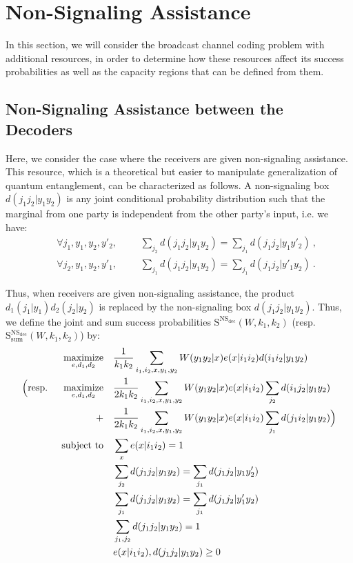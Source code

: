 \section{Non-Signaling Assistance}
\label{section:NSBC}
In this section, we will consider the broadcast channel coding problem with additional resources, in order to determine how these resources affect its success probabilities as well as the capacity regions that can be defined from them.

\subsection{Non-Signaling Assistance between the Decoders}
Here, we consider the case where the receivers are given non-signaling assistance. This resource, which is a theoretical but easier to manipulate generalization of quantum entanglement, can be characterized as follows.  A non-signaling box $d(j_1j_2|y_1y_2)$ is any joint conditional probability distribution such that the marginal from one party is independent from the other party's input, i.e. we have:
\begin{equation}
  \begin{aligned}
    &&\forall j_1,y_1,y_2,y'_2, &&&\sum_{j_2} d(j_1j_2|y_1y_2) = \sum_{j_1} d(j_1j_2|y_1y'_2) \ ,\\
    &&\forall j_2,y_1,y_2,y'_1, &&&\sum_{j_1} d(j_1j_2|y_1y_2) = \sum_{j_1} d(j_1j_2|y'_1y_2) \ .
  \end{aligned}
\end{equation}

Thus, when receivers are given non-signaling assistance, the product $d_1(j_1|y_1)d_2(j_2|y_2)$ is replaced by the non-signaling box $d(j_1j_2|y_1y_2)$. Thus, we define the joint and sum success probabilities $\mathrm{S}^{\mathrm{NS}_{\text{dec}}}(W,k_1,k_2)$ (resp. $\mathrm{S}_{\text{sum}}^{\mathrm{NS}_{\text{dec}}}(W,k_1,k_2)$) by:
\begin{equation}
  \begin{aligned}
    &&\underset{e,d_1,d_2}{\operatorname{\text{maximize}}} &&& \frac{1}{k_1k_2}\sum_{i_1,i_2,x,y_1,y_2} W(y_1y_2|x)e(x|i_1i_2)d(i_1i_2|y_1y_2)\\
    \Big(\text{resp. }&&\underset{e,d_1,d_2}{\operatorname{\text{maximize}}} &&& \frac{1}{2k_1k_2}\sum_{i_1,i_2,x,y_1,y_2} W(y_1y_2|x)e(x|i_1i_2)\sum_{j_2}d(i_1j_2|y_1y_2)\\
    &&+&&& \frac{1}{2k_1k_2}\sum_{i_1,i_2,x,y_1,y_2} W(y_1y_2|x)e(x|i_1i_2)\sum_{j_1}d(j_1i_2|y_1y_2)\Big)\\
    &&\operatorname{\text{subject to}} &&& \sum_x e(x|i_1i_2) = 1\\
    &&&&& \sum_{j_2} d(j_1j_2|y_1y_2) = \sum_{j_1} d(j_1j_2|y_1y'_2)\\
    &&&&& \sum_{j_1} d(j_1j_2|y_1y_2) = \sum_{j_1} d(j_1j_2|y'_1y_2)\\
    &&&&& \sum_{j_1,j_2} d(j_1j_2|y_1y_2) = 1\\
    &&&&& e(x|i_1i_2), d(j_1j_2|y_1y_2) \geq 0\\
  \end{aligned}
\end{equation}

